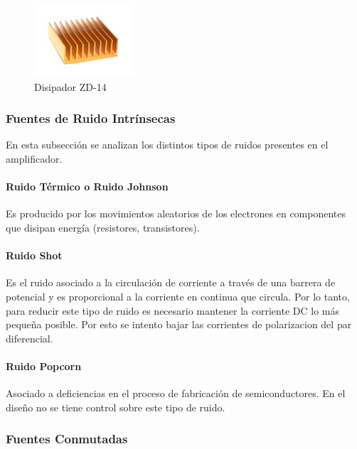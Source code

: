 \documentclass[a4paper,12pt,twoside]{article}
\begin{document}
\begin{figure}[H]
    \centering
    \includegraphics[height=0.4\textwidth]{img/zd14.jpg}
    \caption{Disipador ZD-14}
    \label{fig:diszd14}
\end{figure}

\subsubsection{Fuentes de Ruido Intrínsecas}

En esta subsección se analizan los distintos tipos de ruidos presentes en el amplificador.

\paragraph{Ruido Térmico o Ruido Johnson}

Es producido por los movimientos aleatorios de los electrones en componentes que disipan energía (resistores, transistores).

\paragraph{Ruido Shot}

Es el ruido asociado a la circulación de corriente a través de una barrera de potencial y es proporcional a la corriente en continua que circula. Por lo tanto, para reducir este tipo de ruido es necesario mantener la corriente DC lo más pequeña posible. Por esto se intento bajar las corrientes de polarizacion del par diferencial.

\paragraph{Ruido Popcorn}

Asociado a deficiencias en el proceso de fabricación de semiconductores. En el diseño no se tiene control sobre este tipo de ruido.

\subsubsection{Fuentes Conmutadas}
\label{sec:fuente}
\end{document}
